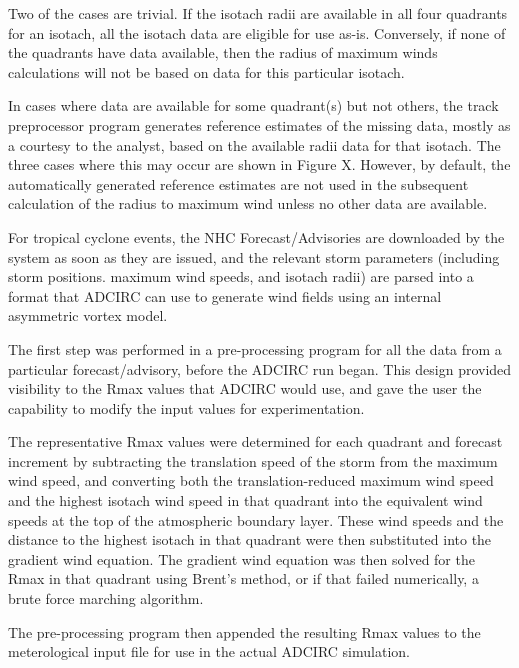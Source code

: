 \documentclass[jmse,article,submit,moreauthors,pdftex,12pt,a4paper]{mdpi}
\begin{document}
Two of the cases are trivial. If the isotach radii are available in 
all four quadrants for an isotach, all the isotach data are eligible 
for use as-is. Conversely, if none of the quadrants have data 
available, then the radius of maximum winds calculations will not be 
based on data for this particular isotach. 

In cases where data are available for some quadrant(s) but not 
others, the track preprocessor program generates reference estimates 
of the missing data, mostly as a courtesy to the analyst, based on 
the available radii data for that isotach. The three cases where 
this may occur are shown in Figure X. However, by default, the 
automatically generated reference estimates are not used in the 
subsequent calculation of the radius to maximum wind unless no other 
data are available. 

For tropical cyclone events, the NHC Forecast/Advisories are 
downloaded by the system as soon as they are issued, and the 
relevant storm parameters (including storm positions. maximum wind 
speeds, and isotach radii) are parsed into a format that ADCIRC can 
use to generate wind fields using an internal asymmetric vortex 
model. 

The first step was performed in a pre-processing program for all the 
data from a particular forecast/advisory, before the ADCIRC run 
began. This design provided visibility to the Rmax values that 
ADCIRC would use, and gave the user the capability to modify the 
input values for experimentation.

The representative Rmax values were determined for each quadrant and 
forecast increment by subtracting the translation speed of the storm 
from the maximum wind speed, and converting both the 
translation-reduced maximum wind speed and the highest isotach wind 
speed in that quadrant into the equivalent wind speeds at the top of 
the atmospheric boundary layer. These wind speeds and the distance 
to the highest isotach in that quadrant were then substituted into 
the gradient wind equation. The gradient wind equation was then 
solved for the Rmax in that quadrant using Brent's method, or if 
that failed numerically, a brute force marching algorithm.

The pre-processing program then appended the resulting Rmax values 
to the meterological input file for use in the actual ADCIRC 
simulation.
\end{document}
